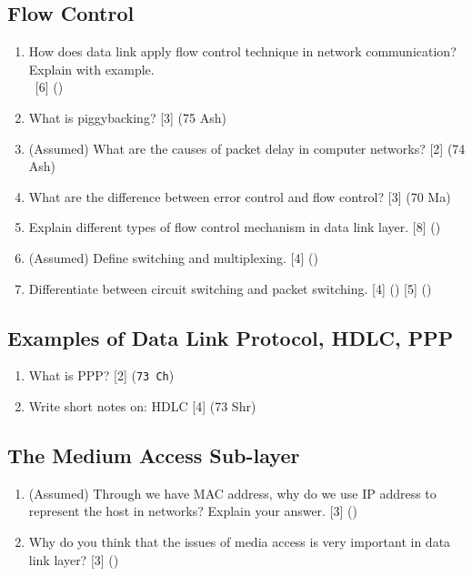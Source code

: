 \documentclass[12pt]{article}
\newcommand{\enter}{\\\textcolor{white}{1}}
\begin{document}
	\subsection{Flow Control}
		\begin{enumerate}[noitemsep, topsep=0pt]
			\item How does data link apply flow control technique in network communication? Explain with example.
			\enter\hfill [6] ()

			\item What is piggybacking? \hfill [3] (75 Ash)

			\item (Assumed) What are the causes of packet delay in computer networks? \hfill [2] (74 Ash)

			\item What are the difference between error control and flow control? \hfill [3] (70 Ma)

			\item Explain different types of flow control mechanism in data link layer. \hfill [8] ()

			\item (Assumed) Define switching and multiplexing. \hfill [4] ()

			\item Differentiate between circuit switching and packet switching. \hfill [4] () [5] ()
		\end{enumerate}

	\subsection{Examples of Data Link Protocol, HDLC, PPP}
		\begin{enumerate}
			\item What is PPP? \hfill[2] (\texttt{73 Ch})

			\item Write short notes on: HDLC \hfill [4] (73 Shr)
		\end{enumerate}
	\subsection{The Medium Access Sub-layer}
		\begin{enumerate}[noitemsep, topsep=0pt]
			\item (Assumed) Through we have MAC address, why do we use IP address to represent the host in networks? Explain your answer. \hfill [3] ()

			\item Why do you think that the issues of media access is very important in data link layer? \hfill [3] ()
		\end{enumerate}
\end{document}
